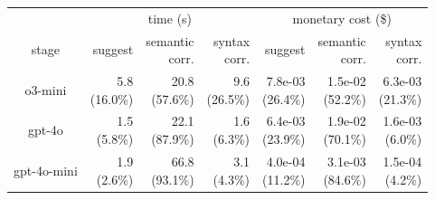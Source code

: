 \begin{table}[h]
\footnotesize
\centering
\setlength{\tabcolsep}{6pt}
\def\arraystretch{1.1}
\vspace{-5pt}
\begin{tabular}{  c | r r r | r r r }
\toprule
& \multicolumn{3}{c|}{time (s)} 
& \multicolumn{3}{c}{monetary cost (\$)} \\
stage & suggest & \makecell{semantic\\corr.} & \makecell{syntax\\corr.} & suggest & \makecell{semantic\\corr.} & \makecell{syntax\\corr.} \\
\midrule
o3-mini     & \makecell{5.8\\(16.0\%)} & \makecell{20.8\\(57.6\%)}  & \makecell{9.6\\(26.5\%)}  & \makecell{7.8e-03\\(26.4\%)} & \makecell{1.5e-02\\(52.2\%)}  & \makecell{6.3e-03\\(21.3\%)} \\
gpt-4o & \makecell{1.5\\(5.8\%)} & \makecell{22.1\\(87.9\%)}  & \makecell{1.6\\(6.3\%)}  & \makecell{6.4e-03\\(23.9\%)} & \makecell{1.9e-02\\(70.1\%)}  & \makecell{1.6e-03\\(6.0\%)} \\
gpt-4o-mini & \makecell{1.9\\(2.6\%)} & \makecell{66.8\\(93.1\%)}  & \makecell{3.1\\(4.3\%)}  & \makecell{4.0e-04\\(11.2\%)}  & \makecell{3.1e-03\\(84.6\%)}   & \makecell{1.5e-04\\(4.2\%)} \\

\end{tabular}
\end{table}
